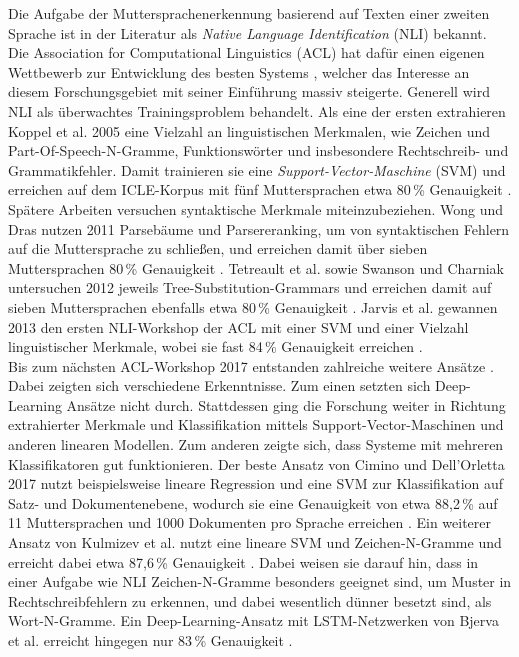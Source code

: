 \documentclass[bachelor,german]{info1thesis}
\begin{document}
Die Aufgabe der Muttersprachenerkennung basierend auf Texten einer zweiten Sprache ist in der Literatur als \textit{Native Language Identification} (NLI) bekannt. Die Association for Computational Linguistics (ACL) hat dafür einen eigenen Wettbewerb zur Entwicklung des besten Systems \cite{Tetreault2013,Malmasi2017}, welcher das Interesse an diesem Forschungsgebiet mit seiner Einführung massiv steigerte. Generell wird NLI als überwachtes Trainingsproblem behandelt. Als eine der ersten extrahieren Koppel et al. 2005 eine Vielzahl an linguistischen Merkmalen, wie Zeichen und Part-Of-Speech-N-Gramme, Funktionswörter und insbesondere Rechtschreib- und Grammatikfehler. Damit trainieren sie eine \textit{Support-Vector-Maschine} (SVM) und erreichen auf dem ICLE-Korpus mit fünf Muttersprachen etwa 80\,\% Genauigkeit \cite{Koppel2005}. \\
Spätere Arbeiten versuchen syntaktische Merkmale miteinzubeziehen. Wong und Dras nutzen 2011 Parsebäume und Parsereranking, um von syntaktischen Fehlern auf die Muttersprache zu schließen, und erreichen damit über sieben Muttersprachen 80\,\% Genauigkeit \cite{Wong2011}. Tetreault  et al. sowie Swanson und Charniak untersuchen 2012 jeweils Tree-Substitution-Grammars und erreichen damit auf sieben Muttersprachen ebenfalls etwa 80\,\% Genauigkeit \cite{Tetreault2012,Swanson2012}. Jarvis et al. gewannen 2013 den ersten NLI-Workshop der ACL mit einer SVM und einer Vielzahl linguistischer Merkmale, wobei sie fast 84\,\% Genauigkeit erreichen \cite{Jarvis2013}. \\
Bis zum nächsten ACL-Workshop 2017 entstanden zahlreiche weitere Ansätze \cite{Malmasi2017}. Dabei zeigten sich verschiedene Erkenntnisse. Zum einen setzten sich Deep-Learning Ansätze nicht durch. Stattdessen ging die Forschung weiter in Richtung extrahierter Merkmale und Klassifikation mittels Support-Vector-Maschinen und anderen linearen Modellen. Zum anderen zeigte sich, dass Systeme mit mehreren Klassifikatoren gut funktionieren. Der beste Ansatz von Cimino und Dell'Orletta 2017 nutzt beispielsweise lineare Regression und  eine SVM zur Klassifikation auf Satz- und Dokumentenebene, wodurch sie eine Genauigkeit von etwa 88,2\,\% auf 11 Muttersprachen und 1000 Dokumenten pro Sprache erreichen \cite{Cimino2017}. Ein weiterer Ansatz von Kulmizev et al. nutzt eine lineare SVM und Zeichen-N-Gramme und erreicht dabei etwa 87,6\,\% Genauigkeit \cite{Kulmizev2017}. Dabei weisen sie darauf hin, dass in einer Aufgabe wie NLI Zeichen-N-Gramme besonders geeignet sind, um Muster in Rechtschreibfehlern zu erkennen, und dabei wesentlich dünner besetzt sind, als Wort-N-Gramme. Ein Deep-Learning-Ansatz mit LSTM-Netzwerken von Bjerva et al. erreicht hingegen nur 83\,\% Genauigkeit \cite{Bjerva2017}.
\end{document}
